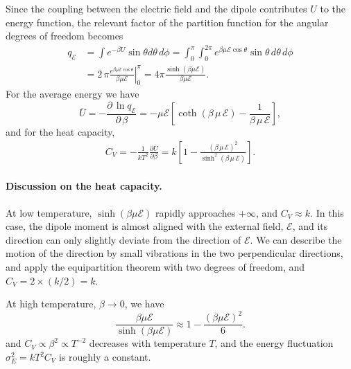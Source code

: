 \documentclass[twocolumn, 10pt]{article}
\numberwithin{equation}{section}
\newenvironment{solution}[1][\empty]
{\par\medskip\sffamily
  \textbf{\ifx\empty#1{Solution.}\relax\else{#1}\fi} \ignorespaces}
{\medskip}
\begin{document}
\begin{solution}
Since the coupling between the electric field
and the dipole contributes $U$
to the energy function,
the relevant factor of the partition function
for the angular degrees of freedom becomes
\begin{align*}
  q_{\mathscr E}
  &=
  \int e^{-\beta U} \sin\theta d\theta \, d\phi
  =
  \int_0^\pi
  \int_0^{2\pi}
  e^{\beta \mu \mathscr E \cos\theta}
  \sin\theta \, d\theta \, d\phi
  \\
  &=
  2 \, \pi \left. \frac{
    e^{\beta \mu \mathscr E \cos\theta }
  } { \beta \mu \mathscr E}
  \right|_{0}^\pi
  =
  4 \pi \frac{ \sinh(\beta\mu\mathscr E) }
  {\beta \mu \mathscr E}
  .
\end{align*}
For the average energy we have
\begin{equation}
  \overline U
  =
  - \frac{ \partial \, \ln q_{\mathscr E} }
         { \partial \, \beta }
  =
  -\mu \mathscr E
  \left[
    \coth(\beta \, \mu \, \mathscr E)
    -
    \frac{1}{\beta \, \mu \, \mathscr E}
  \right]
  ,
  \label{eq:Uav_muE}
\end{equation}
and for the heat capacity,
\begin{align*}
  C_V
  =-\frac{ 1 } { k T^2 }
    \frac{ \partial \overline U }
    {\partial \beta }
  =
  k
  \left[
    1
    -
    \frac{ ( \beta \, \mu \, \mathscr E)^2}
     {\sinh^2(\beta \, \mu \, \mathscr E)}
  \right].
\end{align*}

\paragraph*{Discussion on the heat capacity.}
At low temperature, $\sinh(\beta\mu\mathscr E)$ rapidly approaches $+\infty$,
and $C_V \approx k$.
%
In this case, the dipole moment
is almost aligned with the external field, $\mathscr E$,
and its direction can only slightly deviate
from the direction of $\mathscr E$.
%
We can describe the motion of the direction
by small vibrations in the two perpendicular directions,
and apply the equipartition theorem
with two degrees of freedom,
and $C_V = 2 \times (k/2) = k$.

At high temperature, $\beta \to 0$, we have
$$
\frac{\beta\mu\mathscr E}
{\sinh(\beta\mu\mathscr E)} \approx 1 - \frac{(\beta\mu\mathscr E)^2}{6}.
$$
and $C_V \propto \beta^2 \propto T^{-2}$
decreases with temperature $T$,
and the energy fluctuation
$\sigma_E^2 = k T^2 C_V$
is roughly a constant.


\end{solution}
\end{document}
